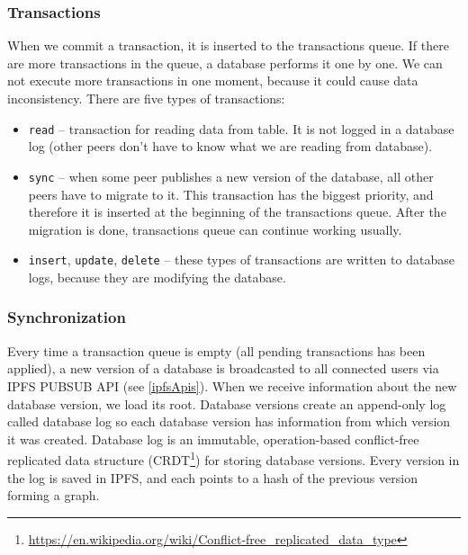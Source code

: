 \subsubsection{Transactions}
When we commit a transaction, it is inserted to the transactions queue. If there are more transactions in the queue, a database performs it one by one. We can not execute more transactions in one moment, because it could cause data inconsistency. There are five types of transactions:
\begin{itemize}
    \item \texttt{read} -- transaction for reading data from table. It is not logged in a database log (other peers don't have to know what we are reading from database).
    \item \texttt{sync} -- when some peer publishes a new version of the database, all other peers have to migrate to it. This transaction has the biggest priority, and therefore it is inserted at the beginning of the transactions queue. After the migration is done, transactions queue can continue working usually.
    \item \texttt{insert}, \texttt{update}, \texttt{delete} -- these types of transactions are written to database logs, because they are modifying the database.
\end{itemize}

\subsubsection{Synchronization} 
\label{designSync}
Every time a transaction queue is empty (all pending transactions has been applied), a new version of a database is broadcasted to all connected users via IPFS PUBSUB API (see \ref{ipfsApis}). When we receive information about the new database version, we load its root. Database versions create an append-only log called database log so each database version has information from which version it was created. Database log is an immutable, operation-based conflict-free replicated data structure (CRDT\footnote{\url{https://en.wikipedia.org/wiki/Conflict-free_replicated_data_type}}) for storing database versions. Every version in the log is saved in IPFS, and each points to a hash of the previous version forming a graph.

